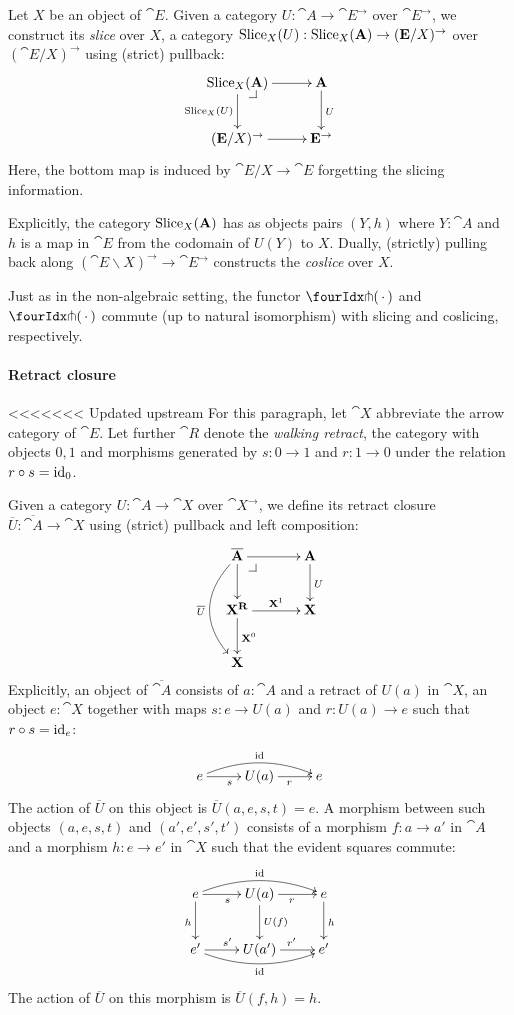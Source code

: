 \documentclass[reqno,10pt,a4paper,oneside]{amsart}
\begin{document}
Let $X$ be an object of $\cat{E}$.
Given a category $U : \cat{A} \to \cat{E}^{\to}$ over $\cat{E}^{\to}$, we construct its \emph{slice} over $X$, a category $\operatorname{Slice}_X(U) : \operatorname{Slice}_X(\mathbf{A}) \to (\mathbf{E}/X)^{\to}$ over $(\cat{E}/X)^{\to}$ using (strict) pullback:
\[
\xymatrix{
  \Slice_X(\cat{A})
  \ar[r]
  \ar[d]_{\Slice_X(U)}
  \pullback{dr}
&
  \cat{A}
  \ar[d]^{U}
\\
  (\cat{E}/X)^{\to}
  \ar[r]
&
  \cat{E}^{\to}
}
\]
Here, the bottom map is induced by $\cat{E}/X \to \cat{E}$ forgetting the slicing information.

Explicitly, the category $\operatorname{Slice}_X(\mathbf{A})$ has as objects pairs $(Y, h)$ where $Y : \cat{A}$ and $h$ is a map in $\cat{E}$ from the codomain of $U(Y)$ to $X$.
Dually, (strictly) pulling back along $(\cat{E} \backslash X)^{\to} \to \cat{E}^{\to}$ constructs the \emph{coslice} over $X$.

\begin{remark}
\label{pitchfork-slicing}
Just as in the non-algebraic setting, the functor $\liftr{\brarghole}$ and $\liftl{\brarghole}$ commute (up to natural isomorphism) with slicing and coslicing, respectively.
\end{remark}

\paragraph{Retract closure}

<<<<<<< Updated upstream
For this paragraph, let $\cat{X}$ abbreviate the arrow category of $\cat{E}$.
Let further $\cat{R}$ denote the \emph{walking retract}, \ie the category with objects $0, 1$ and morphisms generated by $s : 0 \to 1$ and $r : 1 \to 0$ under the relation $r \mathbin{\circ} s = \operatorname{id}_0$.

Given a category $U : \cat{A} \to \cat{X}$ over $\cat{X}^{\to}$, we define its retract closure $\overline{U} : \overline{\cat{A}} \to \cat{X}$ using (strict) pullback and left composition:
\[
\xymatrix@C+1em{
  \overline{\cat{A}}
  \ar[r]
  \ar[d]
  \ar@/_2em/[dd]_{\overline{U}}
  \pullback{dr}
&
  \cat{A}
  \ar[d]^{U}
\\
  \cat{X}^{\cat{R}}
  \ar[r]^-{\cat{X}^1}
  \ar[d]^{\cat{X}^0}
&
  \cat{X}
\\
  \cat{X}
}
\]
Explicitly, an object of $\overline{\cat{A}}$ consists of $a : \cat{A}$ and a retract of $U(a)$ in $\cat{X}$, \ie an object $e : \cat{X}$ together with maps $s : e \to U(a)$ and $r : U(a) \to e$ such that $r \mathbin{\circ} s = \operatorname{id}_e$:
\[
\xymatrix{
  e
  \ar[r]_{s}
  \ar@/^1em/[rr]^{\id}
&
  U(a)
  \ar[r]_{r}
&
  e
}
\]
The action of $\overline{U}$ on this object is $\overline{U}(a, e, s, t) = e$.
A morphism between such objects $(a, e, s, t)$ and $(a', e', s', t')$ consists of a morphism $f : a \to a'$ in $\cat{A}$ and a morphism $h : e \to e'$ in $\cat{X}$ such that the evident squares commute:
\[
\xymatrix{
  e
  \ar[r]_{s}
  \ar@/^1em/[rr]^{\id}
  \ar[d]_{h}
&
  U(a)
  \ar[r]_{r}
  \ar[d]^{U(f)}
&
  e
  \ar[d]^{h}
\\
  e'
  \ar[r]^{s'}
  \ar@/_1em/[rr]_{\id}
&
  U(a')
  \ar[r]^{r'}
&
  e'
}
\]
The action of $\overline{U}$ on this morphism is $\overline{U}(f, h) = h$.
\end{document}
